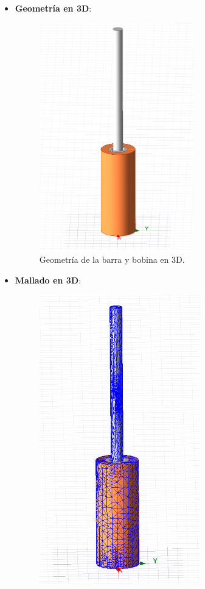 \begin{itemize}
    \item \textbf{Geometría en 3D}:
    \begin{figure}[H]
        \centering
        \includegraphics[width=6.7cm]{FigurasMemoria/geom3d.png}
        \caption{Geometría de la barra y bobina en 3D.}
        \label{fig:geom3d} %
    \end{figure}
    \item \textbf{Mallado en 3D}:
    \begin{figure}[H]
        \centering
        \includegraphics[width=7cm]{FigurasMemoria/mesh3d.png}

\end{figure}
\end{itemize}
